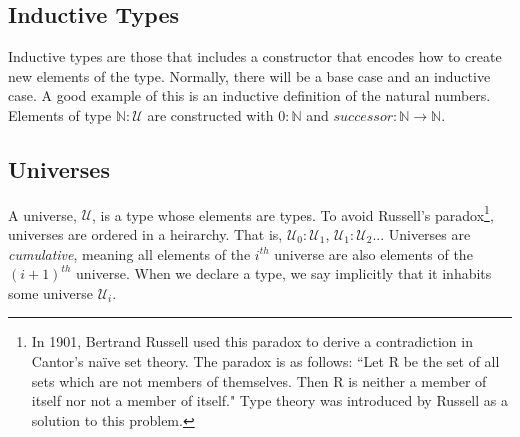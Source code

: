 \documentclass[12pt]{report}
\begin{document}
\subsection*{Inductive Types}
Inductive types are those that includes a constructor that encodes how to create new elements of the type. Normally, there will be a base case and an inductive case. A good example of this is an inductive definition of the natural numbers. Elements of type $\mathbb{N} : \mathcal{U} $ are constructed with $0 : \mathbb{N} $ and $successor : \mathbb{N} \rightarrow \mathbb{N}$.
\subsection*{Universes}
A universe, $\mathcal{U}$, is a type whose elements are types. To avoid Russell's paradox\footnote{
In 1901, Bertrand Russell used this paradox to derive a contradiction in Cantor's na\"ive set theory. The paradox is as follows: ``Let R be the set of all sets which are not members of themselves. Then R is neither a member of itself nor not a member of itself."\cite{rp} Type theory was introduced by Russell as a solution to this problem.
}, universes are ordered in a heirarchy. That is, $\mathcal{U}_0 : \mathcal{U}_1$, $ \mathcal{U}_1 : \mathcal{U}_2$... Universes are \textit{cumulative}, meaning all elements of the $i^{th}$ universe are also elements of the $(i+1)^{th}$ universe. When we declare a type, we say implicitly that it inhabits some universe $\mathcal{U}_i$.
\end{document}
